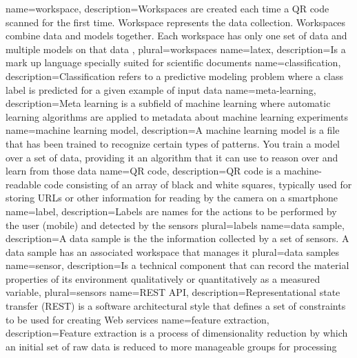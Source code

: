 {
    name={workspace},
    description={Workspaces are created each time a QR code scanned for the first time. Workspace represents the data collection. Workspaces combine data and models together. Each workspace has only one set of data and multiple models on that data
    },
    plural={workspaces}
}
{
    name={latex},
    description={Is a mark up language specially suited for scientific documents}
}
{
    name={classification},
    description={Classification refers to a predictive modeling problem where a class \gls{label} is predicted for a given example of input data}
}
{
    name={meta-learning},
    description={Meta learning is a subfield of machine learning where automatic learning algorithms are applied to metadata about machine learning experiments}
}
{
    name={machine learning model},
    description={A machine learning model is a file that has been trained to recognize certain types of patterns. You train a model over a set of data, providing it an algorithm that it can use to reason over and learn from those data}
}
{
    name={QR code},
    description={QR code is a machine-readable code consisting of an array of black and white squares, typically used for storing URLs or other information for reading by the camera on a smartphone}
}
{
    name={label},
    description={Labels are names for the actions to be performed by the user (mobile) and detected by the sensors}
    plural={labels}
}
{
    name={data sample},
    description={A data sample is the the information collected by a set of sensors. A data sample has an associated \gls{workspace} that manages it}
    plural={data samples}
}
{
    name={sensor},
    description={Is a technical component that can record the material properties of its environment qualitatively or quantitatively as a measured variable},
    plural={sensors}
}
{
    name={REST API},
    description={Representational state transfer (REST) is a software architectural style that defines a set of constraints to be used for creating Web services}
}
{
    name={feature extraction},
    description={Feature extraction is a process of dimensionality reduction by which an initial set of raw data is reduced to more manageable groups for processing}
}
